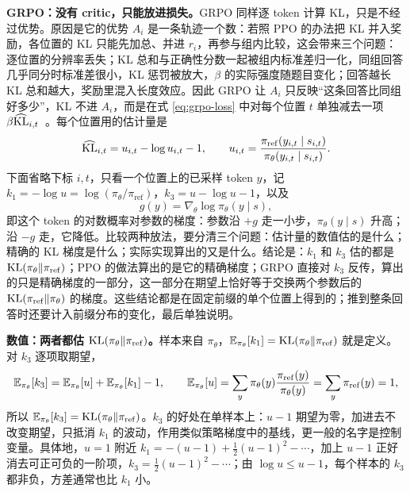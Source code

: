 \textbf{GRPO：没有 critic，只能放进损失。}GRPO 同样逐 token 计算 KL，只是不经过优势。原因是它的优势 \(A_i\) 是一条轨迹一个数：若照 PPO 的办法把 KL 并入奖励，各位置的 KL 只能先加总、并进 \(r_i\)，再参与组内比较，这会带来三个问题：逐位置的分辨率丢失；KL 总和与正确性分数一起被组内标准差归一化，同组回答几乎同分时标准差很小，KL 惩罚被放大，\(\beta\) 的实际强度随题目变化；回答越长 KL 总和越大，奖励里混入长度效应。因此 GRPO 让 \(A_i\) 只反映“这条回答比同组好多少”，KL 不进 \(A_i\)，而是在式 \eqref{eq:grpo-loss} 中对每个位置 \(t\) 单独减去一项 \(\beta\widehat{\mathrm{KL}}_{i,t}\)~\cite{shao2024grpo}。每个位置用的估计量是
\begin{equation}
 \widehat{\mathrm{KL}}_{i,t}=u_{i,t}-\log u_{i,t}-1,\qquad
 u_{i,t}=\frac{\pi_{\mathrm{ref}}(y_{i,t}\mid s_{i,t})}{\pi_\theta(y_{i,t}\mid s_{i,t})}.
 \label{eq:k3-estimator}
\end{equation}
下面省略下标 \(i,t\)，只看一个位置上的已采样 token \(y\)，记 \(k_1=-\log u=\log(\pi_\theta/\pi_{\mathrm{ref}})\)，\(k_3=u-\log u-1\)，以及
\begin{equation}
 g(y)=\nabla_\theta\log\pi_\theta(y\mid s),
\end{equation}
即这个 token 的对数概率对参数的梯度：参数沿 \(+g\) 走一小步，\(\pi_\theta(y\mid s)\) 升高；沿 \(-g\) 走，它降低。比较两种放法，要分清三个问题：估计量的数值估的是什么；精确的 KL 梯度是什么；实际实现算出的又是什么。结论是：\(k_1\) 和 \(k_3\) 估的都是 \(\mathrm{KL}(\pi_\theta\Vert\pi_{\mathrm{ref}})\)；PPO 的做法算出的是它的精确梯度；GRPO 直接对 \(k_3\) 反传，算出的只是精确梯度的一部分，这一部分在期望上恰好等于交换两个参数后的 \(\mathrm{KL}(\pi_{\mathrm{ref}}\Vert\pi_\theta)\) 的梯度。这些结论都是在固定前缀的单个位置上得到的；推到整条回答时还要计入前缀分布的变化，最后单独说明。

\textbf{数值：两者都估 \(\mathrm{KL}(\pi_\theta\Vert\pi_{\mathrm{ref}})\)。}样本来自 \(\pi_\theta\)，\(\mathbb{E}_{\pi_\theta}[k_1]=\mathrm{KL}(\pi_\theta\Vert\pi_{\mathrm{ref}})\) 就是定义。对 \(k_3\) 逐项取期望，
\begin{equation}
 \mathbb{E}_{\pi_\theta}[k_3]=\mathbb{E}_{\pi_\theta}[u]+\mathbb{E}_{\pi_\theta}[k_1]-1,
 \qquad
 \mathbb{E}_{\pi_\theta}[u]=\sum_y\pi_\theta(y)\frac{\pi_{\mathrm{ref}}(y)}{\pi_\theta(y)}=\sum_y\pi_{\mathrm{ref}}(y)=1,
\end{equation}
所以 \(\mathbb{E}_{\pi_\theta}[k_3]=\mathrm{KL}(\pi_\theta\Vert\pi_{\mathrm{ref}})\)。\(k_3\) 的好处在单样本上：\(u-1\) 期望为零，加进去不改变期望，只抵消 \(k_1\) 的波动，作用类似策略梯度中的基线，更一般的名字是控制变量。具体地，\(u=1\) 附近 \(k_1=-(u-1)+\tfrac12(u-1)^2-\cdots\)，加上 \(u-1\) 正好消去可正可负的一阶项，\(k_3=\tfrac12(u-1)^2-\cdots\)；由 \(\log u\le u-1\)，每个样本的 \(k_3\) 都非负，方差通常也比 \(k_1\) 小。

